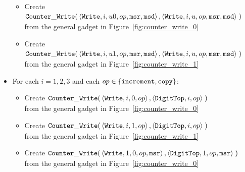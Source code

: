 \begin{itemize}
\begin{itemize}
        \item Create
        $\begin{aligned}[t]
            {\tt Counter\_Write}(& \left\langle {\tt Write}, i, u0, op, {\tt msr}, {\tt msd} \right\rangle,
                      \left\langle {\tt Write}, i, u,  op, {\tt msr}, {\tt msd} \right\rangle \;)
        \end{aligned}$ \\ from the general gadget in Figure~\ref{fig:counter_write_0}

        \item Create
        $\begin{aligned}[t]
            {\tt Counter\_Write}(& \left\langle {\tt Write}, i,  u1, op, {\tt msr}, {\tt msd}\right\rangle,
                      \left\langle {\tt Write}, i,  u,  op, {\tt msr}, {\tt msd}\right\rangle \;)
        \end{aligned}$ \\ from the general gadget in Figure~\ref{fig:counter_write_1}
        \end{itemize}

    \item For each $i = 1,2,3$ and each $op \in \{{\tt increment}, {\tt copy} \}$:
    \begin{itemize}
        \item Create
        $\begin{aligned}[t]
            {\tt Counter\_Write}(& \left\langle {\tt Write},    i, 0, op \right\rangle,
                      \left\langle {\tt DigitTop}, i,    op \right\rangle \;)
        \end{aligned}$ \\ from the general gadget in Figure~\ref{fig:counter_write_0}

        \item Create
        $\begin{aligned}[t]
            {\tt Counter\_Write}(& \left\langle {\tt Write},    i, 1, op \right\rangle,
                      \left\langle {\tt DigitTop}, i,    op \right\rangle \;)
        \end{aligned}$ \\ from the general gadget in Figure~\ref{fig:counter_write_1}

        \item Create
        $\begin{aligned}[t]
            {\tt Counter\_Write}(& \left\langle {\tt Write},    1, 0, op, {\tt msr} \right\rangle,
                      \left\langle {\tt DigitTop}, 1,    op, {\tt msr} \right\rangle \;)
        \end{aligned}$ \\ from the general gadget in Figure~\ref{fig:counter_write_0}


\end{itemize}
\end{itemize}
